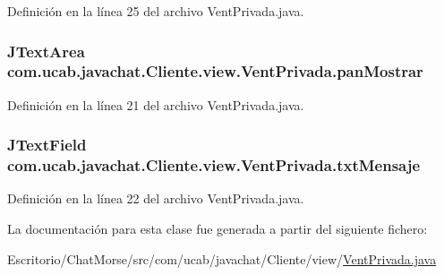 Definición en la línea 25 del archivo Vent\-Privada.\-java.

\hypertarget{classcom_1_1ucab_1_1javachat_1_1_cliente_1_1view_1_1_vent_privada_a662e79a310b85a9d2992e940a170df3b}{
\subsubsection[{pan\-Mostrar}]{\setlength{\rightskip}{0pt plus 5cm}J\-Text\-Area com.\-ucab.\-javachat.\-Cliente.\-view.\-Vent\-Privada.\-pan\-Mostrar}}\label{classcom_1_1ucab_1_1javachat_1_1_cliente_1_1view_1_1_vent_privada_a662e79a310b85a9d2992e940a170df3b}


Definición en la línea 21 del archivo Vent\-Privada.\-java.

\hypertarget{classcom_1_1ucab_1_1javachat_1_1_cliente_1_1view_1_1_vent_privada_a426509b196af3b4ace6862ccc7fc36c7}{
\subsubsection[{txt\-Mensaje}]{\setlength{\rightskip}{0pt plus 5cm}J\-Text\-Field com.\-ucab.\-javachat.\-Cliente.\-view.\-Vent\-Privada.\-txt\-Mensaje}}\label{classcom_1_1ucab_1_1javachat_1_1_cliente_1_1view_1_1_vent_privada_a426509b196af3b4ace6862ccc7fc36c7}


Definición en la línea 22 del archivo Vent\-Privada.\-java.



La documentación para esta clase fue generada a partir del siguiente fichero\-:\begin{DoxyCompactItemize}
\item 
Escritorio/\-Chat\-Morse/src/com/ucab/javachat/\-Cliente/view/\hyperlink{_vent_privada_8java}{Vent\-Privada.\-java}\end{DoxyCompactItemize}
